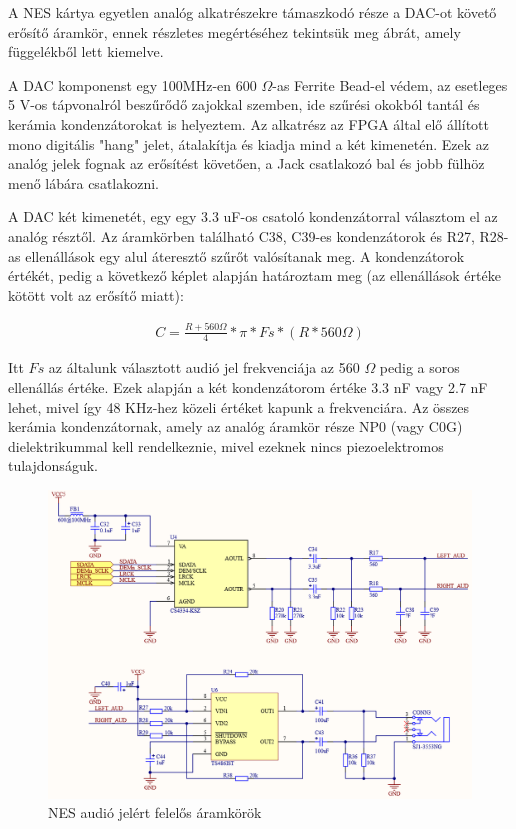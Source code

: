	A NES kártya egyetlen analóg alkatrészekre támaszkodó része a DAC-ot követő erősítő áramkör, ennek részletes megértéséhez tekintsük meg  ábrát, amely  függelékből lett kiemelve.
	
	A DAC komponenst egy 100MHz-en 600 $\Omega$-as Ferrite Bead-el védem, az esetleges 5 V-os tápvonalról beszűrődő zajokkal szemben, ide szűrési okokból tantál és kerámia kondenzátorokat is helyeztem. Az alkatrész az FPGA által elő állított mono digitális "hang" jelet, átalakítja és kiadja mind a két kimenetén. Ezek az analóg jelek fognak az erősítést követően, a Jack csatlakozó bal és jobb fülhöz menő lábára csatlakozni. 
	
	A DAC két kimenetét, egy egy 3.3 uF-os csatoló kondenzátorral választom el az analóg résztől. Az áramkörben található C38, C39-es kondenzátorok és R27, R28-as ellenállások egy alul áteresztő szűrőt valósítanak meg. A kondenzátorok értékét, pedig a következő képlet alapján határoztam meg (az ellenállások értéke kötött volt az erősítő miatt):
	
	\begin{align}	
		C = \frac{R + 560 \Omega}{4} *\pi * Fs * (R * 560 \Omega)
	\end{align} 
	
	Itt $Fs$ az általunk választott audió jel frekvenciája az 560 $\Omega$ pedig a soros ellenállás értéke. Ezek alapján a két kondenzátorom értéke 3.3 nF vagy 2.7 nF lehet, mivel így 48 KHz-hez közeli értéket kapunk a frekvenciára. Az összes kerámia kondenzátornak, amely az analóg áramkör része NP0 (vagy C0G) dielektrikummal kell rendelkeznie, mivel ezeknek nincs piezoelektromos tulajdonságuk.   
	
	\begin{figure}[H]
		\centering
		\includegraphics[width=150mm, keepaspectratio]{figures/DAC-AMP-JACK}
		\caption{NES audió jelért felelős áramkörök}
		\label{fig:DAC-AMP-JACK}
	\end{figure}
	
